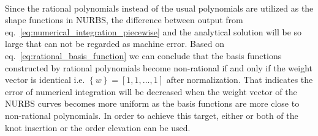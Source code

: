 \paragraph{}
Since the rational polynomials instead of the usual polynomials are utilized as the shape functions in NURBS, the difference between
    output from eq.~\ref{eq:numerical_integration_piecewise} and the analytical solution will be so large that can not be regarded as
    machine error.
Based on eq.~\ref{eq:rational_basis_function} we can conclude that the basis functions constructed by rational polynomials become
    non-rational if and only if the weight vector is identical i.e. $\left\{ w \right\} = \left[ 1,1,\dots,1 \right]$ after normalization.
That indicates the error of numerical integration will be decreased when the weight vector of the NURBS curves becomes more uniform as
    the basis functions are more close to non-rational polynomials.
In order to achieve this target, either or both of the knot insertion or the order elevation can be used.
\pagebreak